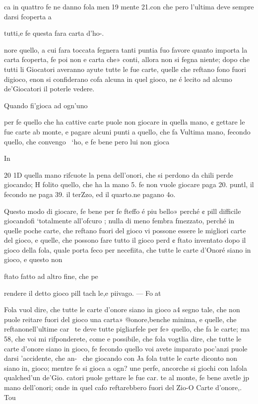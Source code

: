 \documentclass[12pt,a6paper]{article}
\begin{document}
ca in quattro fe ne danno fola men19
mente 21.con che pero l’ultima
deve sempre darsi fcoperta a

tutti,e fe questa fara carta d’ho-.

nore quello, a cui fara toccata
fegnera tanti puntia fuo favore
quanto importa la carta fcoperta, fe poi non e carta che»
conti, allora non si fegna niente; dopo che tutti li Giocatori
averanno ayute tutte le fue carte, quelle che reftano fono fuori digioco, enon si confiderano cofa alcuna in quel gioco, ne
é lecito ad alcuno de’Giocatori
il poterle vedere.

Quando fi'gioca ad ogn’uno

per fe quello che ha cattive carte puole non giocare in quella
mano, ¢ gettare le fue carte ab
monte, e pagare alcuni punti
a quello, che fa Vultima mano,
fecondo quello, che convengo~
‘ho, e fe bene pero lui non gioca

In
 

 

20
1D quella mano rifcuote la pena
dell’onori, che si perdono da
chili perde giocando; H folito
quello, che ha la mano 5. fe non
vuole giocare paga 20. puntl, il
fecondo ne paga 39. il terZzo, ed
il quarto.ne pagano 4o.

Questo modo di giocare, fe
bene per fe fteffo é piu bello»
perché ¢ pill difficile giocandofi
‘totalmente all’ofcuro ; nulla di
meno fembra fmezzato, perché
in quelle poche carte, che reftano fuori del gioco vi possone
essere le migliori carte del gioco, e quelle, che possono fare
tutto il gioco perd ¢ ftato inventato dopo il gioco della fola, quale porta feco per necefiita, che tutte le carte d’Onoré
siano in gioco, e questo non

ftato fatto ad altro fine, che pe

rendere il detto gioco pill tach
le,e piivago. — Foat

Fola vuol dire, che tutte le
carte d’onore siano in gioco a4
segno tale, che non puole reitare fuori del gioco una carta»
@onore,benche minima, e quelle, che reftanonell’ultime car~
te deve tutte pigliarfele per fe»
quello, che fa le carte; ma 58,
che voi mi rifponderete, come
e possibile, che fola vogtlia dire, che tutte le carte d’onore
siano in gioco, fe fecondo quello voi avete imparato poc’anzi
puole darsi ’accidente, che an-~
che giocando con Ja fola tutte
le carte diconto non siano in,
gioco; mentre fe si gioca a ogn?
une perfe, ancorche si giochi
con lafola qualched’un de’Gio.
catori puole gettare le fue car.
te al monte, fe bene avetle jp
mano dell’onori; onde in quel
cafo reftarebbero fuori del Zio-O Carte d’onore,. Tou
\end{document}
